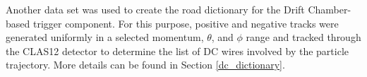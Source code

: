 Another data set was used to create the road dictionary for the Drift Chamber-based trigger component.  For this purpose, positive and negative tracks were generated uniformly  in a selected momentum, $\theta$, and $\phi$ range and tracked through the CLAS12 detector to determine the list of DC wires involved by the particle trajectory. More details can be found in Section \ref{dc_dictionary}.
